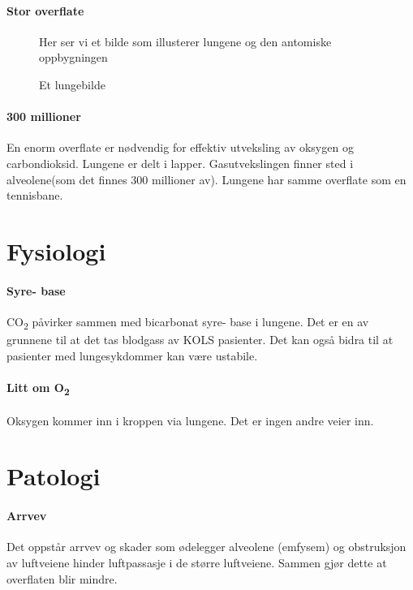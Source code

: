 			\paragraph{Stor overflate\\}
				\begin{figure}[ht]
                      \centering
                      \caption{Et lungebilde}
                      {Her ser vi et bilde som illusterer lungene og den antomiske oppbygningen}%
                    \end{figure}
            \paragraph{300 millioner\\}
            	En enorm overflate er nødvendig for effektiv utveksling av oksygen og carbondioksid. Lungene er delt i lapper. Gasutvekslingen finner sted i alveolene(som det finnes 300 millioner av). Lungene har samme overflate som en tennisbane.
		\section{Fysiologi}
				\paragraph{Syre- base\\}
					CO\textsubscript{2} påvirker sammen med bicarbonat syre- base i lungene. Det er en av grunnene til at det tas blodgass av KOLS pasienter. Det kan også bidra til at pasienter med lungesykdommer kan være ustabile.
				\paragraph{Litt om O\textsubscript{2}\\}
					Oksygen kommer inn i kroppen via lungene. Det er ingen andre veier inn. 
		\section{Patologi}
			\paragraph{Arrvev\\}
				Det oppstår arrvev og skader som ødelegger alveolene (emfysem) og obstruksjon av luftveiene hinder luftpassasje i de større luftveiene. Sammen gjør dette at overflaten blir mindre.
